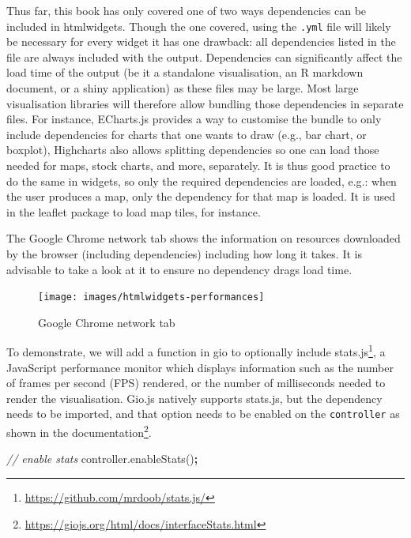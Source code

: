 \documentclass[10pt,]{krantz}
\makeatletter
\newenvironment{Shaded}{\begin{snugshade}}{\end{snugshade}}
\newcommand{\AttributeTok}[1]{\textcolor[rgb]{0.61,0.61,0.61}{#1}}
\newcommand{\CommentTok}[1]{\textcolor[rgb]{0.37,0.37,0.37}{\textit{#1}}}
\newcommand{\NormalTok}[1]{#1}
\newcommand{\OperatorTok}[1]{\textcolor[rgb]{0.43,0.43,0.43}{\textbf{#1}}}
\newcommand{\VariableTok}[1]{\textcolor[rgb]{0,0,0}{#1}}
\renewcommand{\href}[2]{#2\footnote{\url{#1}}}
\newenvironment{kframe}{%
\medskip{}
\setlength{\fboxsep}{.8em}
 \def\at@end@of@kframe{}%
 \ifinner\ifhmode%
  \def\at@end@of@kframe{\end{minipage}}%
  \begin{minipage}{\columnwidth}%
 \fi\fi%
 \def\FrameCommand##1{\hskip\@totalleftmargin \hskip-\fboxsep
 \colorbox{shadecolor}{##1}\hskip-\fboxsep
     \hskip-\linewidth \hskip-\@totalleftmargin \hskip\columnwidth}%
 \MakeFramed {\advance\hsize-\width
   \@totalleftmargin\z@ \linewidth\hsize
   \@setminipage}}%
 {\par\unskip\endMakeFramed%
 \at@end@of@kframe}
\renewenvironment{Shaded}{\begin{kframe}}{\end{kframe}}
\makeatother
\begin{document}
Thus far, this book has only covered one of two ways dependencies can be included in htmlwidgets. Though the one covered, using the \texttt{.yml} file will likely be necessary for every widget it has one drawback: all dependencies listed in the file are always included with the output. Dependencies can significantly affect the load time of the output (be it a standalone visualisation, an R markdown document, or a shiny application) as these files may be large. Most large visualisation libraries will therefore allow bundling those dependencies in separate files. For instance, ECharts.js provides a way to customise the bundle to only include dependencies for charts that one wants to draw (e.g., bar chart, or boxplot), Highcharts also allows splitting dependencies so one can load those needed for maps, stock charts, and more, separately. It is thus good practice to do the same in widgets, so only the required dependencies are loaded, e.g.: when the user produces a map, only the dependency for that map is loaded. It is used in the leaflet package to load map tiles, for instance.

The Google Chrome network tab shows the information on resources downloaded by the browser (including dependencies) including how long it takes. It is advisable to take a look at it to ensure no dependency drags load time.

\begin{figure}[H]

{\centering \texttt{[image: images/htmlwidgets-performances]} 

}

\caption{Google Chrome network tab}\label{fig:htmlwidgets-performances}
\end{figure}

To demonstrate, we will add a function in gio to optionally include \href{https://github.com/mrdoob/stats.js/}{stats.js}, a JavaScript performance monitor which displays information such as the number of frames per second (FPS) rendered, or the number of milliseconds needed to render the visualisation. Gio.js natively supports stats.js, but the dependency needs to be imported, and that option needs to be enabled on the \texttt{controller} as shown in the \href{https://giojs.org/html/docs/interfaceStats.html}{documentation}.

\begin{Shaded}
\begin{Highlighting}[]
\CommentTok{// enable stats}
\VariableTok{controller}\NormalTok{.}\AttributeTok{enableStats}\NormalTok{()}\OperatorTok{;}
\end{Highlighting}
\end{Shaded}
\end{document}
